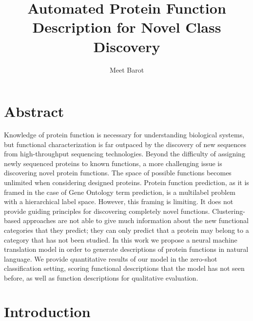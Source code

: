 \documentclass{specification}
\title{Automated Protein Function Description for Novel Class Discovery}
\author{Meet Barot}
\begin{document}
\maketitle

\section{Abstract}
Knowledge of protein function is necessary for understanding biological systems, but functional characterization is far outpaced by the discovery of new sequences from high-throughput sequencing technologies.
Beyond the difficulty of assigning newly sequenced proteins to known functions, a more challenging issue is discovering novel protein functions.
The space of possible functions becomes unlimited when considering designed proteins.
Protein function prediction, as it is framed in the case of Gene Ontology term prediction, is a multilabel problem with a hierarchical label space.
However, this framing is limiting. It does not provide guiding principles for discovering completely novel functions.
Clustering-based approaches are not able to give much information about the new functional categories that they predict; they can only predict that a protein may belong to a category that has not been studied.
In this work we propose a neural machine translation model in order to generate descriptions of protein functions in natural language.
We provide quantitative results of our model in the zero-shot classification setting, scoring functional descriptions that the model has not seen before, as well as function descriptions for qualitative evaluation.

\section{Introduction}
\end{document}
